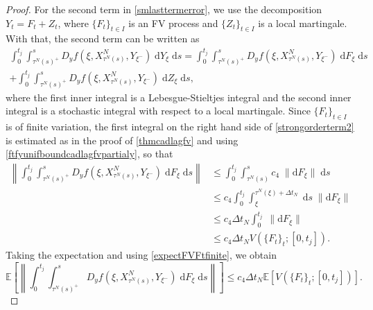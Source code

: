 \documentclass[reqno,12pt]{amsart}
\theoremstyle{plain} %
\theoremstyle{definition} %
\begin{document}
\begin{proof}
    For the second term in \eqref{smlasttermerror}, we use the decomposition $Y_t = F_t + Z_t$, where $\{F_t\}_{t\in I}$ is an FV process and $\{Z_t\}_{t\in I}$ is a local martingale. With that, the second term can be written as
    \begin{multline}
        \label{strongorderterm2}
        \int_0^{t_j} \int_{\tau^N(s)^+}^s D_y f(\xi, X_{\tau^N(s)}^N, Y_{\xi^-}) \;\mathrm{d}Y_\xi \;\mathrm{d}s = \int_0^{t_j} \int_{\tau^N(s)^+}^s D_y f(\xi, X_{\tau^N(s)}^N, Y_{\xi^-}) \;\mathrm{d}F_\xi \;\mathrm{d}s \\  
        + \int_0^{t_j} \int_{\tau^N(s)^+}^s D_y f(\xi, X_{\tau^N(s)}^N, Y_{\xi^-}) \;\mathrm{d}Z_\xi \;\mathrm{d}s,
    \end{multline}
    where the first inner integral is a Lebesgue-Stieltjes integral and the second inner integral is a stochastic integral with respect to a local martingale. Since $\{F_t\}_{t\in I}$ is of finite variation, the first integral on the right hand side of \eqref{strongorderterm2} is estimated as in the proof of \cref{thmcadlagfv} and using \eqref{ftfyunifboundcadlagfvpartialy}, so that
    \begin{align*}
        \left\|\int_0^{t_j} \int_{\tau^N(s)^+}^s D_y f(\xi, X_{\tau^N(s)}^N, Y_{\xi^-}) \;\mathrm{d}F_\xi\;\mathrm{d}s\right\| & \leq \int_0^{t_j} \int_{\tau^N(s)}^s c_4\;\|\mathrm{d}F_\xi\|\;\mathrm{d}s \\
        & \leq c_4\int_0^{t_j} \int_{\xi}^{\tau^N(\xi) + \Delta t_N} \;\mathrm{d}s\;\|\mathrm{d}F_\xi\| \\
        & \leq c_4\Delta t_N\int_0^{t_j} \;\|\mathrm{d}F_\xi\| \\
        & \leq c_4\Delta t_N V(\{F_t\}_t; [0, t_j]).
    \end{align*}
    Taking the expectation and using \eqref{expectFVFtfinite}, we obtain
    \begin{equation}
        \label{strongorderterm2a}
        \mathbb{E}\left[\left\|\int_0^{t_j} \int_{\tau^N(s)^+}^s D_y f(\xi, X_{\tau^N(s)}^N, Y_{\xi^-}) \;\mathrm{d}F_\xi\;\mathrm{d}s\right\|\right] \leq c_4 \Delta t_N \mathbb{E}\left[ V(\{F_t\}_t; [0, t_j]) \right].
    \end{equation}
    

\end{proof}
\end{document}

